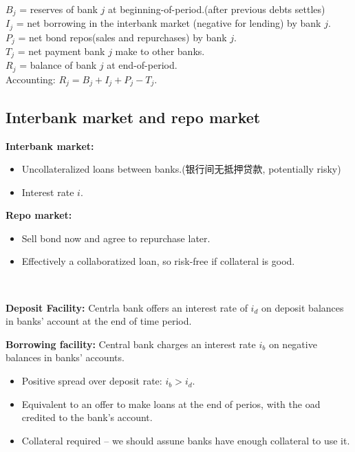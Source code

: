 \begin{note}
    \ 

    $B_j$ = reserves of bank $j$ at beginning-of-period.(after previous debts settles) \\
    $I_j$ = net borrowing in the interbank market (negative for
    lending) by bank $j$. \\
    $P_j$ = net bond repos(sales and repurchases) by bank $j$. \\
    $T_j$ = net payment bank $j$ make to other banks. \\
    $R_j$ = balance of bank $j$ at end-of-period. \\
    Accounting: $R_j = B_j + I_j + P_j - T_j$.
\end{note}

\subsection{Interbank market and repo market}
\textbf{Interbank market:}
\begin{itemize}
    \item Uncollateralized loans between banks.(银行间无抵押贷款, potentially risky)
    \item Interest rate $i$.
\end{itemize}

\textbf{Repo market:}
\begin{itemize}
    \item Sell bond now and agree to repurchase later.
    \item Effectively a collaboratized loan, so risk-free if collateral is good.
\end{itemize}

\begin{note}
    \ 

    \textbf{Deposit Facility:} Centrla bank offers an interest rate of $i_d$ on deposit balances in banks' account at the end of time period.

    \textbf{Borrowing facility:} Central bank charges an interest rate $i_b$ on negative balances in banks' accounts.
    \begin{itemize}
        \item Positive spread over deposit rate: $i_b > i_d$.
        \item Equivalent to an offer to make loans at the end of perios, with the oad credited to the bank's account.
        \item Collateral required -- we should assune banks have enough collateral to use it.
    \end{itemize}
\end{note}

